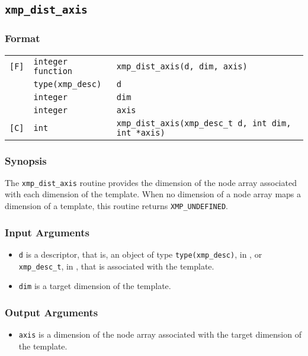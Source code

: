 \subsection{\tt xmp\_dist\_axis}

\subsubsection*{Format}

\begin{tabular}{lll}

\verb![F]!& {\tt integer function}& {\tt xmp\_dist\_axis(d, dim, axis)}\\
          & {\tt type(xmp\_desc)} & {\tt d}\\
          & {\tt integer} & {\tt dim}\\
          & {\tt integer} & {\tt axis}\\

\verb![C]!&  {\tt int}& {\tt xmp\_dist\_axis(xmp\_desc\_t d, int dim, int *axis)}\\

\end{tabular}

\subsubsection*{Synopsis}

The {\tt xmp\_dist\_axis} routine provides the dimension of the node array associated with each dimension of the template. When no dimension of a node array maps a dimension of a template, this routine returns {\tt XMP\_UNDEFINED}.


\subsubsection*{Input Arguments}
\begin{itemize}
 \item {\tt d} is a descriptor, that is, an object of type 
       {\tt type(xmp\_desc)}, in {\XMPF}, or {\tt xmp\_desc\_t},
       in {\XMPC}, that is associated with the template.
 \item {\tt dim} is a target dimension of the template.
\end{itemize}

\subsubsection*{Output Arguments}
\begin{itemize}
 \item {\tt axis} is a dimension of the node array associated with the target dimension of the template.
\end{itemize}


